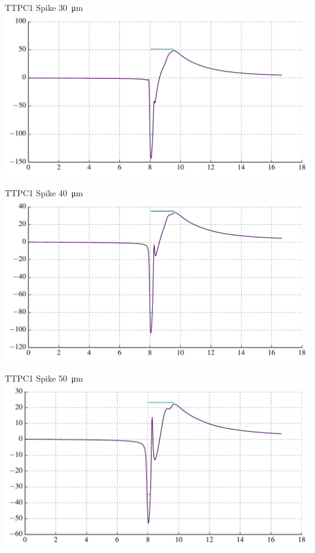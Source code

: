 \documentclass{beamer}
\begin{document}
\begin{frame}{TTPC1 Spike \SI{30}{\micro\metre}}{}
    \centering
    \includegraphics[width=1.0\textwidth]{images/sym_elec_t_170_p_0_n_4.pdf}
\end{frame}

\begin{frame}{TTPC1 Spike \SI{40}{\micro\metre}}{}
    \centering
    \includegraphics[width=1.0\textwidth]{images/sym_elec_t_170_p_0_n_6.pdf}
\end{frame}

\begin{frame}{TTPC1 Spike \SI{50}{\micro\metre}}{}
    \centering
    \includegraphics[width=1.0\textwidth]{images/sym_elec_t_170_p_0_n_8.pdf}
\end{frame}
\end{document}
